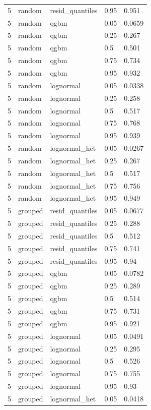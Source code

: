 \begin{tabular}{lllll}
5 & random & resid\_quantiles & 0.95 & 0.951 \\
5 & random & qgbm & 0.05 & 0.0659 \\
5 & random & qgbm & 0.25 & 0.267 \\
5 & random & qgbm & 0.5 & 0.501 \\
5 & random & qgbm & 0.75 & 0.734 \\
5 & random & qgbm & 0.95 & 0.932 \\
5 & random & lognormal & 0.05 & 0.0338 \\
5 & random & lognormal & 0.25 & 0.258 \\
5 & random & lognormal & 0.5 & 0.517 \\
5 & random & lognormal & 0.75 & 0.768 \\
5 & random & lognormal & 0.95 & 0.939 \\
5 & random & lognormal\_het & 0.05 & 0.0267 \\
5 & random & lognormal\_het & 0.25 & 0.267 \\
5 & random & lognormal\_het & 0.5 & 0.517 \\
5 & random & lognormal\_het & 0.75 & 0.756 \\
5 & random & lognormal\_het & 0.95 & 0.949 \\
5 & grouped & resid\_quantiles & 0.05 & 0.0677 \\
5 & grouped & resid\_quantiles & 0.25 & 0.288 \\
5 & grouped & resid\_quantiles & 0.5 & 0.512 \\
5 & grouped & resid\_quantiles & 0.75 & 0.741 \\
5 & grouped & resid\_quantiles & 0.95 & 0.94 \\
5 & grouped & qgbm & 0.05 & 0.0782 \\
5 & grouped & qgbm & 0.25 & 0.289 \\
5 & grouped & qgbm & 0.5 & 0.514 \\
5 & grouped & qgbm & 0.75 & 0.731 \\
5 & grouped & qgbm & 0.95 & 0.921 \\
5 & grouped & lognormal & 0.05 & 0.0491 \\
5 & grouped & lognormal & 0.25 & 0.295 \\
5 & grouped & lognormal & 0.5 & 0.526 \\
5 & grouped & lognormal & 0.75 & 0.755 \\
5 & grouped & lognormal & 0.95 & 0.93 \\
5 & grouped & lognormal\_het & 0.05 & 0.0418 \\

\end{tabular}
